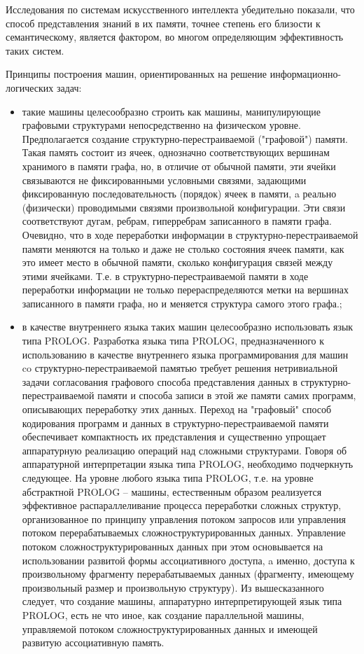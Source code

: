 Исследования по системам искусственного интеллекта убедительно показали, что способ представления знаний в их памяти, точнее степень его близости к семантическому, является фактором, во многом определяющим эффективность таких систем.

Принципы построения машин, ориентированных на решение информационно-логических задач:
\begin{itemize}
	\item такие машины целесообразно строить как машины, манипулирующие графовыми структурами непосредственно на физическом уровне. Предполагается создание структурно-перестраиваемой ("графовой") памяти. Такая память состоит из ячеек, однозначно соответствующих вершинам хранимого в памяти графа, но, в отличие от обычной памяти, эти ячейки связываются не фиксированными условными связями, задающими фиксированную последовательность (порядок) ячеек в памяти, a реально (физически) проводимыми связями произвольной конфигурации. Эти связи соответствуют дугам, ребрам, гиперребрам записанного в памяти графа. Очевидно, что в ходе переработки информации в структурно-перестраиваемой памяти меняются на только и даже не столько состояния ячеек памяти, как это имеет место в обычной памяти, сколько конфигурация связей между этими ячейками. Т.е. в структурно-перестраиваемой памяти в ходе переработки информации не только перераспределяются метки на вершинах записанного в памяти графа, но и меняется структура самого этого графа.;
	\item в качестве внутреннего языка таких машин целесообразно использовать язык типа PROLOG. Разработка языка типа PROLOG, предназначенного к использованию в качестве внутреннего языка программирования для машин co структурно-перестраиваемой памятью требует решения нетривиальной задачи согласования графового способа представления данных в структурно-перестраиваемой памяти и способа записи в этой же памяти самих программ, описывающих переработку этих данных. Переход на "графовый" способ кодирования программ и данных в структурно-перестраиваемой памяти обеспечивает компактность их представления и существенно упрощает аппаратурную реализацию операций над сложными структурами. Говоря об аппаратурной интерпретации языка типа PROLOG, необходимо подчеркнуть следующее. На уровне любого языка типа PROLOG, т.е. на уровне абстрактной PROLOG -- машины, естественным образом реализуется эффективное распараллеливание процесса переработки сложных структур, организованное по принципу управления потоком запросов или управления потоком перерабатываемых сложноструктурированных данных. Управление потоком сложноструктурированных данных при этом основывается на использовании развитой формы ассоциативного доступа, a именно, доступа к произвольному фрагменту перерабатываемых данных (фрагменту, имеющему произвольный размер и произвольную структуру). Из вышесказанного следует, что создание машины, аппаратурно интерпретирующей язык типа PROLOG, есть не что иное, как создание параллельной машины, управляемой потоком сложноструктурированных данных и имеющей развитую ассоциативную память.

\end{itemize}
